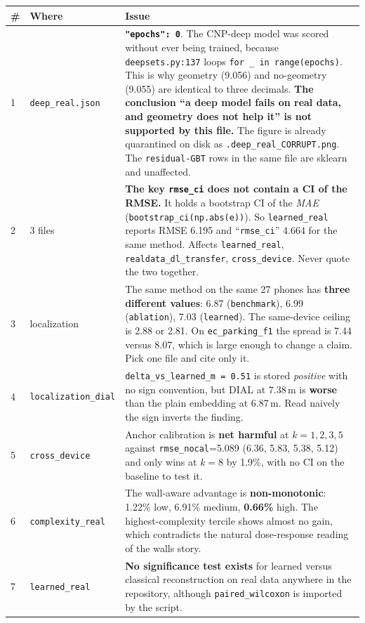 \documentclass[10pt,a4paper]{article}
\newcommand{\B}[1]{\textcolor{bad}{\textbf{#1}}}
\begin{document}
\begin{longtable}{@{}p{0.5cm}p{2.6cm}p{13.4cm}@{}}
\toprule
\# & Where & Issue \\ \midrule
1 & \texttt{deep\_real.json} & \B{\texttt{"epochs": 0}}. The CNP-deep model was scored
without ever being trained, because \texttt{deepsets.py:137} loops
\texttt{for \_ in range(epochs)}. This is why geometry (9.056) and no-geometry (9.055)
are identical to three decimals. \textbf{The conclusion ``a deep model fails on real
data, and geometry does not help it'' is not supported by this file.} The figure is
already quarantined on disk as \texttt{.deep\_real\_CORRUPT.png}. The
\texttt{residual-GBT} rows in the same file are sklearn and unaffected. \\
2 & 3 files & \B{The key \texttt{rmse\_ci} does not contain a CI of the RMSE.} It holds
a bootstrap CI of the \emph{MAE} (\texttt{bootstrap\_ci(np.abs(e))}). So
\texttt{learned\_real} reports RMSE 6.195 and ``\texttt{rmse\_ci}'' 4.664 for the same
method. Affects \texttt{learned\_real}, \texttt{realdata\_dl\_transfer},
\texttt{cross\_device}. Never quote the two together. \\
3 & localization & The same method on the same 27 phones has \B{three different values}:
6.87 (\texttt{benchmark}), 6.99 (\texttt{ablation}), 7.03 (\texttt{learned}). The
same-device ceiling is 2.88 or 2.81. On \texttt{ec\_parking\_f1} the spread is 7.44
versus 8.07, which is large enough to change a claim. Pick one file and cite only it. \\
4 & \texttt{localization\_dial} & \texttt{delta\_vs\_learned\_m = 0.51} is stored
\emph{positive} with no sign convention, but DIAL at 7.38\,m is \B{worse} than the plain
embedding at 6.87\,m. Read naively the sign inverts the finding. \\
5 & \texttt{cross\_device} & Anchor calibration is \B{net harmful} at $k=1,2,3,5$ against
\texttt{rmse\_nocal}=5.089 (6.36, 5.83, 5.38, 5.12) and only wins at $k=8$ by 1.9\%,
with no CI on the baseline to test it. \\
6 & \texttt{complexity\_real} & The wall-aware advantage is \B{non-monotonic}: 1.22\%
low, 6.91\% medium, \B{0.66\%} high. The highest-complexity tercile shows almost no
gain, which contradicts the natural dose-response reading of the walls story. \\
7 & \texttt{learned\_real} & \B{No significance test exists} for learned versus classical
reconstruction on real data anywhere in the repository, although
\texttt{paired\_wilcoxon} is imported by the script. \\

\end{longtable}
\end{document}
